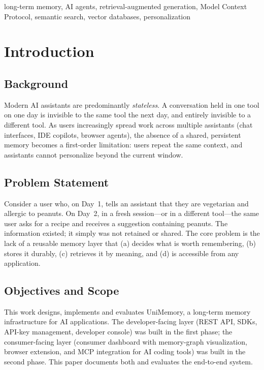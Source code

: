 \documentclass[conference]{IEEEtran}
\begin{document}
\begin{IEEEkeywords}
long-term memory, AI agents, retrieval-augmented generation, Model Context
Protocol, semantic search, vector databases, personalization
\end{IEEEkeywords}

\section{Introduction}
\subsection{Background}
Modern AI assistants are predominantly \emph{stateless}. A conversation held in
one tool on one day is invisible to the same tool the next day, and entirely
invisible to a different tool. As users increasingly spread work across multiple
assistants (chat interfaces, IDE copilots, browser agents), the absence of a
shared, persistent memory becomes a first-order limitation: users repeat the
same context, and assistants cannot personalize beyond the current window.

\subsection{Problem Statement}
Consider a user who, on Day~1, tells an assistant that they are vegetarian and
allergic to peanuts. On Day~2, in a fresh session---or in a different
tool---the same user asks for a recipe and receives a suggestion containing
peanuts. The information existed; it simply was not retained or shared. The
core problem is the lack of a reusable memory layer that (a) decides what is
worth remembering, (b) stores it durably, (c) retrieves it by meaning, and
(d) is accessible from any application.

\subsection{Objectives and Scope}
This work designs, implements and evaluates UniMemory, a long-term memory
infrastructure for AI applications. The developer-facing layer (REST API, SDKs,
API-key management, developer console) was built in the first phase; the
consumer-facing layer (consumer dashboard with memory-graph visualization,
browser extension, and MCP integration for AI coding tools) was built in the
second phase. This paper documents both and evaluates the end-to-end system.
\end{document}
